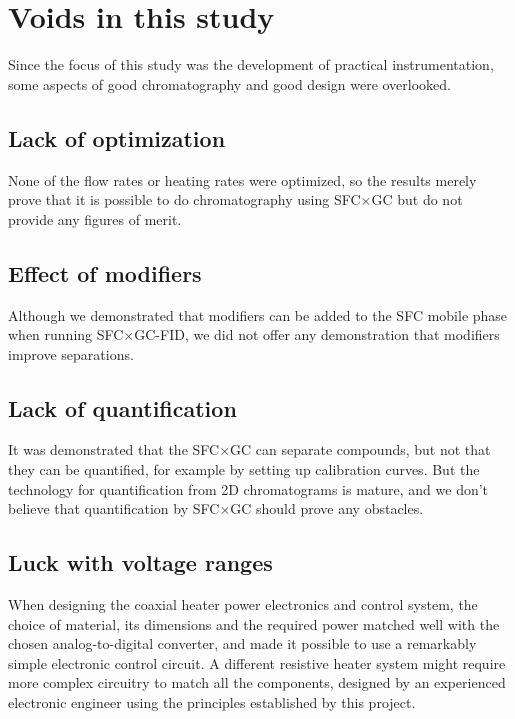 \section{Voids in this study} 

Since the focus of this study was the development of practical instrumentation,
some aspects of good chromatography and good design were overlooked.

\subsection{Lack of optimization}

None of the flow rates or heating rates were optimized, so the results merely
prove that it is possible to do chromatography using SFC×GC but do not provide
any figures of merit.

\subsection{Effect of modifiers}

Although we demonstrated that modifiers can be added to the SFC mobile phase
when running SFC×GC-FID, we did not offer any demonstration that modifiers
improve separations.

\subsection{Lack of quantification}

It was demonstrated that the SFC×GC can separate compounds, but not that they
can be quantified, for example by setting up calibration curves. But the
technology for quantification from 2D chromatograms is mature, and we don't
believe that quantification by SFC×GC should prove any obstacles.

\subsection{Luck with voltage ranges}

When designing the coaxial heater power electronics and control system, the
choice of material, its dimensions and the required power matched well with the
chosen analog-to-digital converter, and made it possible to use a remarkably
simple electronic control circuit. A different resistive heater system might
require more complex circuitry to match all the components, designed by an
experienced electronic engineer using the principles established by this
project.

